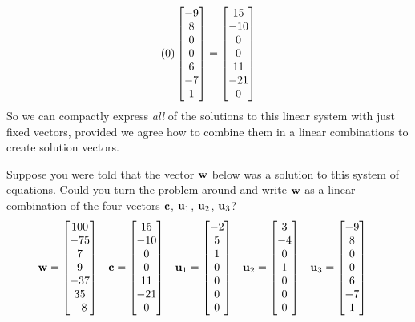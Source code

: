 \documentclass{ximera}
\begin{document}
\begin{example}
\begin{align*}
    (0)\begin{bmatrix}-9\\ 8\\ 0\\ 0\\ 6\\ -7\\ 1\end{bmatrix}
    =
    \begin{bmatrix}15\\ -10\\ 0\\ 0\\ 11\\ -21\\ 0\end{bmatrix}
  \end{align*}
  So we can compactly express \textit{all} of the solutions to this
  linear system with just  fixed vectors, provided we agree
  how to combine them in a linear combinations to create solution
  vectors.

  Suppose you were told that the vector $\mathbf{w}$ below was a solution to this system of equations.  Could you turn the problem around and write $\mathbf{w}$ as a linear combination of the four vectors $\mathbf{c}$, $\mathbf{u}_1$, $\mathbf{u}_2$, $\mathbf{u}_3$?
  \begin{align*}
    \mathbf{w}&=\begin{bmatrix}100\\-75\\7\\9\\-37\\35\\-8\end{bmatrix}
            &
              \mathbf{c}&=\begin{bmatrix}15\\ -10\\ 0\\ 0\\ 11\\ -21\\ 0\end{bmatrix}
            &
              \mathbf{u}_1&=\begin{bmatrix}-2\\ 5\\ 1\\ 0\\ 0\\ 0\\ 0\end{bmatrix}
            &
              \mathbf{u}_2&=\begin{bmatrix}3\\ -4\\ 0\\ 1\\ 0\\ 0\\ 0\end{bmatrix}
            &
              \mathbf{u}_3&=\begin{bmatrix}-9\\ 8\\ 0\\ 0\\ 6\\ -7\\ 1\end{bmatrix}
  \end{align*}

\end{example}
\end{document}
